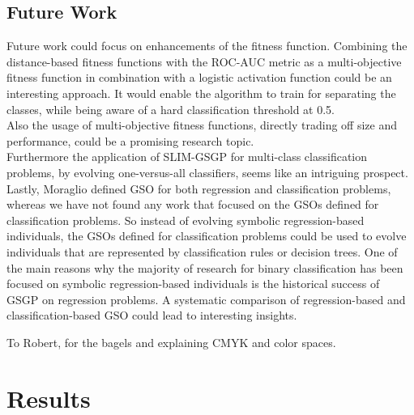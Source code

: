 \documentclass[manuscript, review, anonymous]{acmart} %
\begin{document}
\subsection{Future Work}
Future work could focus on enhancements of the fitness function.
Combining the distance-based fitness functions with the ROC-AUC metric as a multi-objective fitness function
in combination with a logistic activation function could
be an interesting approach. It would enable the algorithm to train for
separating the classes, while being aware of a hard classification threshold at 0.5.\\
Also the usage of multi-objective fitness functions, directly trading off size
and performance, could be a promising research topic.\\
Furthermore the application of SLIM-GSGP
for multi-class classification problems, by evolving one-versus-all classifiers, seems like
an intriguing prospect.\\
Lastly, Moraglio \cite{Moraglio2012} defined GSO for both regression and classification problems, whereas we have not found any work
that focused on the GSOs defined for classification problems. So instead of evolving symbolic regression-based individuals,
the GSOs defined for classification problems could be used to evolve individuals that are represented by classification rules
or decision trees. One of the main reasons why the majority of research for binary classification has been focused
on symbolic regression-based individuals is the historical success of GSGP 
on regression problems. A systematic comparison of regression-based and classification-based GSO 
could lead to interesting insights.





\begin{acks}
To Robert, for the bagels and explaining CMYK and color spaces.
\end{acks}





\appendix

\section{Results}
\end{document}
